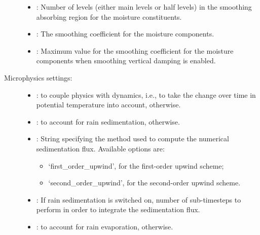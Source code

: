 \documentclass[letterpaper,10pt,english]{sphinxmanual}
\begin{document}
\begin{description}
\begin{itemize}
\begin{itemize}
\end{itemize}

\item {} 
: Number of levels (either main levels or half levels)             in the smoothing absorbing region for the moisture constituents.

\item {} 
: The smoothing coefficient for the moisture components.

\item {} 
: Maximum value for the smoothing coefficient for              the moisture components when smoothing vertical damping is enabled.

\end{itemize}

\item[{Microphysics settings:}] \leavevmode\begin{itemize}
\item {} 
:  to couple physics with dynamics,           i.e., to take the change over time in potential temperature into account,  otherwise.

\item {} 
:  to account for rain sedimentation,  otherwise.

\item {} 
: String specifying the method used to compute the numerical          sedimentation flux. Available options are:
\begin{itemize}
\item {} 
‘first\_order\_upwind’, for the first-order upwind scheme;

\item {} 
‘second\_order\_upwind’, for the second-order upwind scheme.

\end{itemize}

\item {} 
: If rain sedimentation is switched on, number of sub-timesteps                to perform in order to integrate the sedimentation flux.

\item {} 
:  to account for rain evaporation,  otherwise.


\end{itemize}
\end{description}
\end{document}
